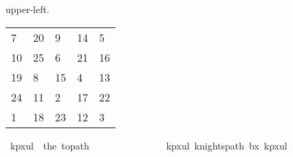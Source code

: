 \begin{isabellebody}
\begin{isamarkuptext}
upper-left.
  \begin{table}[H]
    \begin{tabular}{lllll}
       7 & 20 &  9 & 14 &  5 \\
      10 & 25 &  6 & 21 & 16 \\
      19 &  8 & 15 &  4 & 13 \\
      24 & 11 &  2 & 17 & 22 \\
       1 & 18 & 23 & 12 &  3
    \end{tabular}
  \end{table}%
\end{isamarkuptext}\isamarkuptrue%
\isamarkupfalse%
\ {\isachardoublequoteopen}kp{}x{}ul\ {\isasymequiv}\ the\ {\isacharparenleft}{\kern0pt}to{\isacharunderscore}{\kern0pt}path\ \isanewline
\ \ {\isacharbrackleft}{\kern0pt}{\isacharbrackleft}{\kern0pt}{}{\isacharcomma}{\kern0pt}{}{}{\isacharcomma}{\kern0pt}{}{\isacharcomma}{\kern0pt}{}{}{\isacharcomma}{\kern0pt}{}{\isacharbrackright}{\kern0pt}{\isacharcomma}{\kern0pt}\isanewline
\ \ {\isacharbrackleft}{\kern0pt}{}{}{\isacharcomma}{\kern0pt}{}{}{\isacharcomma}{\kern0pt}{}{\isacharcomma}{\kern0pt}{}{}{\isacharcomma}{\kern0pt}{}{}{\isacharbrackright}{\kern0pt}{\isacharcomma}{\kern0pt}\isanewline
\ \ {\isacharbrackleft}{\kern0pt}{}{}{\isacharcomma}{\kern0pt}{}{\isacharcomma}{\kern0pt}{}{}{\isacharcomma}{\kern0pt}{}{\isacharcomma}{\kern0pt}{}{}{\isacharbrackright}{\kern0pt}{\isacharcomma}{\kern0pt}\isanewline
\ \ {\isacharbrackleft}{\kern0pt}{}{}{\isacharcomma}{\kern0pt}{}{}{\isacharcomma}{\kern0pt}{}{\isacharcomma}{\kern0pt}{}{}{\isacharcomma}{\kern0pt}{}{}{\isacharbrackright}{\kern0pt}{\isacharcomma}{\kern0pt}\isanewline
\ \ {\isacharbrackleft}{\kern0pt}{}{\isacharcomma}{\kern0pt}{}{}{\isacharcomma}{\kern0pt}{}{}{\isacharcomma}{\kern0pt}{}{}{\isacharcomma}{\kern0pt}{}{\isacharbrackright}{\kern0pt}{\isacharbrackright}{\kern0pt}{\isacharparenright}{\kern0pt}{\isachardoublequoteclose}\isanewline
{}\isamarkupfalse%
\ kp{\isacharunderscore}{\kern0pt}{}x{}{\isacharunderscore}{\kern0pt}ul{\isacharcolon}{\kern0pt}\ {\isachardoublequoteopen}knights{\isacharunderscore}{\kern0pt}path\ b{}x{}\ kp{}x{}ul{\isachardoublequoteclose}\isanewline

\end{isabellebody}
